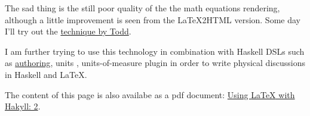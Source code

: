 \documentclass{article}
\begin{document}
The sad thing is the still poor quality of the the math equations rendering,
although a little improvement is seen from the LaTeX2HTML version.
Some day I'll try out the
\href{http://tex.stackexchange.com/questions/44486/pixel-perfect-vertical-alignment-of-image-rendered-tex-snippets}{technique by Todd}.


I am further trying to use this technology in combination with Haskell
DSLs such as
\href{http://hackage.haskell.org/package/authoring}{authoring},
units \citep{muranushi2014experience} ,
units-of-measure plugin \citep{gundry2015typechecker}
in order to write
physical discussions in Haskell and LaTeX.


%
%
%


The content of this page is also availabe as a pdf document:
\href{http://nushio3.github.io/posts/2015-07-03-HTLaTeX/dist/post.pdf}{Using {\LaTeX} with Hakyll: 2}.
\end{document}
